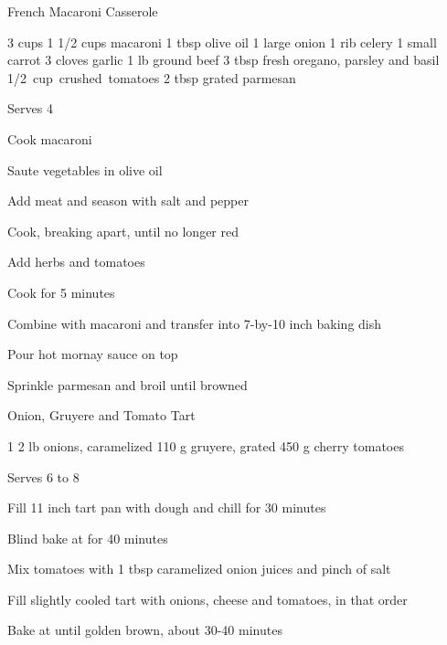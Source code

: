 \begin{denserecipe}{French Macaroni Casserole}{}
\begin{ingredients}
3 cups 
1 1/2 cups macaroni
1 tbsp olive oil
1 large onion
1 rib celery
1 small carrot
3 cloves garlic
1 lb ground beef
3 tbsp fresh oregano, parsley and basil
\mbox{1/2 cup crushed tomatoes}
2 tbsp grated parmesan
\end{ingredients}
\nextcolumn
Serves 4
\begin{steps}
    \item Cook macaroni
    \item Saute vegetables in olive oil
    \item Add meat and season with salt and pepper
    \item Cook, breaking apart, until no longer red
    \item Add herbs and tomatoes
    \item Cook for 5 minutes
    \item Combine with macaroni and transfer into \mbox{7-by-10} inch baking dish
    \item Pour hot mornay sauce on top
    \item Sprinkle parmesan and broil until browned
\end{steps}
\end{denserecipe}

\begin{recipe}{Onion, Gruyere and Tomato Tart}{}
\begin{ingredients}
1 
2 lb onions, caramelized
110 g gruyere, grated
450 g cherry tomatoes
\end{ingredients}
\nextcolumn
Serves 6 to 8
\begin{steps}
    \item Fill 11 inch tart pan with dough and chill for 30 minutes
    \item Blind bake at  for 40 minutes
    \item Mix tomatoes with 1 tbsp caramelized onion juices and pinch of salt
    \item Fill slightly cooled tart with onions, cheese and tomatoes, in that order
    \item Bake at  until golden brown, about 30-40 minutes
\end{steps}
\end{recipe}

